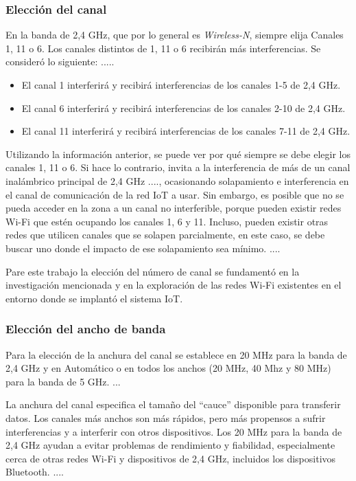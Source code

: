 \subsubsection{Elección del canal}
En la banda de 2,4 GHz, que por lo general es \emph{Wireless-N}, siempre elija Canales 1, 11 o 6. Los canales distintos de 1, 11 o 6 recibirán más interferencias. Se consideró lo siguiente: .....

\begin{itemize}
\item El canal 1 interferirá y recibirá interferencias de los canales 1-5 de  2,4 GHz.
\item El canal 6 interferirá y recibirá interferencias de los canales 2-10 de  2,4 GHz.
\item El canal 11 interferirá y recibirá interferencias de los canales 7-11 de 2,4 GHz.
\end{itemize}

Utilizando la información anterior, se puede ver por qué siempre se debe elegir los canales 1, 11 o 6. Si hace lo contrario, invita a la interferencia de más de un canal inalámbrico principal de 2,4 GHz ...., ocasionando solapamiento e interferencia en el canal de comunicación de la red IoT a usar. Sin embargo, es posible que no se pueda acceder en la zona a un canal no interferible, porque pueden existir redes Wi-Fi que estén ocupando los canales 1, 6 y 11. Incluso, pueden existir otras redes que utilicen canales que se solapen parcialmente, en este caso, se debe buscar uno donde el impacto de ese solapamiento sea mínimo. ....

Pare este trabajo la elección del número de canal se fundamentó en la investigación mencionada y en la exploración de las redes Wi-Fi existentes en el entorno donde se implantó el sistema IoT.

\subsubsection{Elección del ancho de banda}

Para la elección de la anchura del canal se establece en 20 MHz para la banda de 2,4 GHz y en Automático o en todos los anchos (20 MHz, 40 Mhz y 80 MHz) para la banda de 5 GHz. ...

La anchura del canal especifica el tamaño del ``cauce'' disponible para transferir datos. Los canales más anchos son más rápidos, pero más propensos a sufrir interferencias y a interferir con otros dispositivos. Los 20 MHz para la banda de 2,4 GHz ayudan a evitar problemas de rendimiento y fiabilidad, especialmente cerca de otras redes Wi-Fi y dispositivos de 2,4 GHz, incluidos los dispositivos Bluetooth. ....

